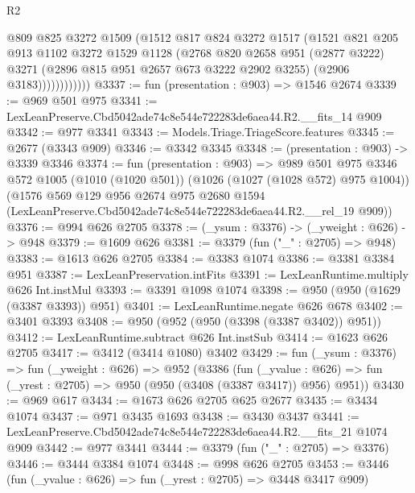 \begin{lexlean}{R2}
\begin{coremodule}
                    @809
                    @825
                    @3272
                    @1509
                    (@1512
                      @817
                      @824
                      @3272
                      @1517
                      (@1521
                        @821
                        @205
                        @913
                        @1102
                        @3272
                        @1529
                        @1128
                        (@2768
                          @820
                          @2658
                          @951
                          (@2877 @3222)
                          @3271
                          (@2896 @815 @951 @2657 @673 @3222 @2902 @3255)
                          (@2906 @3183))))))))))))
@3337 := fun (presentation : @903) => @1546 @2674
@3339 := @969 @501 @975
@3341 := LexLeanPreserve.Cbd5042ade74c8e544e722283de6aea44.R2.__fits_14 @909
@3342 := @977 @3341
@3343 := Models.Triage.TriageScore.features
@3345 := @2677 (@3343 @909)
@3346 := @3342 @3345
@3348 := (presentation : @903) -> @3339 @3346
@3374 := fun (presentation : @903) =>
  @989
    @501
    @975
    @3346
    @572
    @1005
    (@1010 (@1020 @501))
    (@1026 (@1027 (@1028 @572) @975 @1004))
    (@1576
      @569
      @129
      @956
      @2674
      @975
      @2680
      @1594
      (LexLeanPreserve.Cbd5042ade74c8e544e722283de6aea44.R2.__rel_19 @909))
@3376 := @994 @626 @2705
@3378 := (_ysum : @3376) -> (_yweight : @626) -> @948
@3379 := @1609 @626
@3381 := @3379 (fun ("_" : @2705) => @948)
@3383 := @1613 @626 @2705
@3384 := @3383 @1074
@3386 := @3381 @3384 @951
@3387 := LexLeanPreservation.intFits
@3391 := LexLeanRuntime.multiply @626 Int.instMul
@3393 := @3391 @1098 @1074
@3398 := @950 (@950 (@1629 (@3387 @3393)) @951)
@3401 := LexLeanRuntime.negate @626 @678
@3402 := @3401 @3393
@3408 := @950 (@952 (@950 (@3398 (@3387 @3402)) @951))
@3412 := LexLeanRuntime.subtract @626 Int.instSub
@3414 := @1623 @626 @2705
@3417 := @3412 (@3414 @1080) @3402
@3429 := fun (_ysum : @3376) =>
  fun (_yweight : @626) =>
  @952
    (@3386
      (fun (_yvalue : @626) => fun (_yrest : @2705) => @950 (@950 (@3408 (@3387 @3417)) @956) @951))
@3430 := @969 @617
@3434 := @1673 @626 @2705 @625 @2677
@3435 := @3434 @1074
@3437 := @971 @3435 @1693
@3438 := @3430 @3437
@3441 := LexLeanPreserve.Cbd5042ade74c8e544e722283de6aea44.R2.__fits_21 @1074 @909
@3442 := @977 @3441
@3444 := @3379 (fun ("_" : @2705) => @3376)
@3446 := @3444 @3384 @1074
@3448 := @998 @626 @2705
@3453 := @3446 (fun (_yvalue : @626) => fun (_yrest : @2705) => @3448 @3417 @909)

\end{coremodule}
\end{lexlean}
